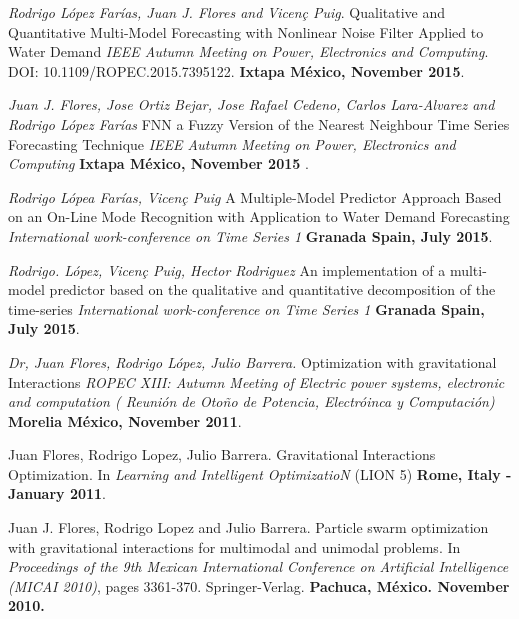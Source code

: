 \documentclass[7pt]{article}
\newenvironment{innerlist}[1][\enskip\textbullet]%
        {\begin{compactitem}[#1]}{\end{compactitem}}
\begin{document}
{\begin{innerlist}
\item \textit{Rodrigo L\'{o}pez Far\'{i}as, Juan J. Flores and Vicen\c{c} Puig}.  Qualitative and Quantitative Multi-Model Forecasting with Nonlinear Noise Filter Applied to Water Demand \textit{IEEE Autumn Meeting on Power, Electronics and Computing}. DOI: 10.1109/ROPEC.2015.7395122.  \textbf{Ixtapa M\'{e}xico, November 2015}.

\item \textit{Juan J. Flores, Jose Ortiz Bejar, Jose Rafael Cedeno, Carlos Lara-Alvarez and Rodrigo L\'{o}pez Far\'{i}as} FNN a Fuzzy Version of the Nearest Neighbour Time Series Forecasting Technique \textit{IEEE Autumn Meeting on Power, Electronics and Computing} \textbf{Ixtapa M\'{e}xico, November 2015 }.

\item \textit{Rodrigo L\'{o}pea Far\'{i}as, Vicen\c{c} Puig}   A Multiple-Model Predictor Approach Based on an On-Line Mode Recognition with Application to Water Demand Forecasting \textit{International work-conference on Time Series 1 
} \textbf{Granada Spain, July 2015}.

\item \textit{Rodrigo. L\'{o}pez, Vicen\c{c} Puig, Hector Rodriguez}   An implementation of a multi-model predictor based on the qualitative and quantitative decomposition of the time-series \textit{International work-conference on Time Series 1 
} \textbf{Granada Spain, July 2015}.

\item \textit{Dr, Juan Flores, Rodrigo López, Julio Barrera.} Optimization with gravitational Interactions  \textit{ROPEC XIII: Autumn Meeting of Electric power systems, electronic and computation ( Reuni\'{o}n de Oto\~no de Potencia, Electr\'{o}inca y Computaci\'{o}n)} \textbf{ Morelia M\'{e}xico, November 2011}.

\item Juan Flores, Rodrigo Lopez, Julio Barrera. Gravitational Interactions Optimization. In \textit{Learning and Intelligent OptimizatioN}  (LION 5) \textbf{Rome, Italy - January 2011}.

\item Juan J. Flores, Rodrigo Lopez and Julio Barrera. Particle swarm optimization with gravitational interactions for multimodal and unimodal problems. In \textit{Proceedings of the 9th Mexican International Conference on Artificial Intelligence (MICAI 2010)}, pages 3361-370. Springer-Verlag. \textbf{Pachuca, México. November 2010.}


\end{innerlist}}
\end{document}
